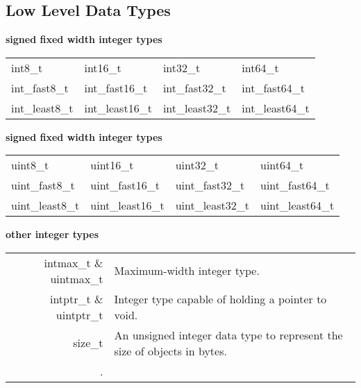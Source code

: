 \documentclass[5pt]{article}
\begin{document}
\begin{multicols}{2}
\subsection{Low Level Data Types}
\textbf{signed fixed width integer types}\\
\begin{tabular}{>{\ttfamily}l >{\ttfamily}l >{\ttfamily}l >{\ttfamily}l}
int8\_t         & int16\_t          & int32\_t          & int64\_t          \\
int\_fast8\_t   & int\_fast16\_t    & int\_fast32\_t    & int\_fast64\_t    \\
int\_least8\_t  & int\_least16\_t   & int\_least32\_t   & int\_least64\_t   \\
\end{tabular}
\textbf{signed fixed width integer types}\\
\begin{tabular}{>{\ttfamily}l >{\ttfamily}l >{\ttfamily}l >{\ttfamily}l}
uint8\_t        & uint16\_t         & uint32\_t         & uint64\_t         \\
uint\_fast8\_t  & uint\_fast16\_t   & uint\_fast32\_t   & uint\_fast64\_t   \\
uint\_least8\_t & uint\_least16\_t  & uint\_least32\_t  & uint\_least64\_t  \\
\end{tabular}
\textbf{other integer types}\\
\begin{tabular}{>{\ttfamily}r l}
    intmax\_t \& uintmax\_t & Maximum-width integer type.\\
    intptr\_t \& uintptr\_t & Integer type capable of holding a pointer to void.\\
    size\_t & An unsigned integer data type to represent the size of objects in bytes.\\
.\\

    
\end{tabular}
\end{multicols}
\end{document}
